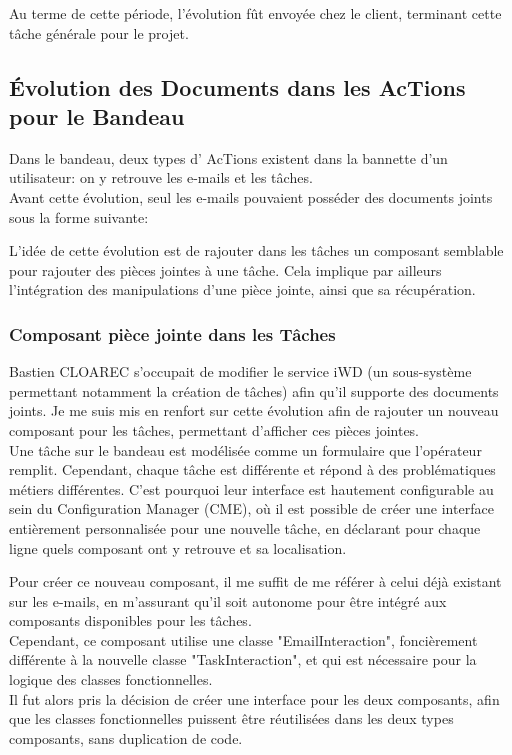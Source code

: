 \documentclass{rapport}
\begin{document}
Au terme de cette période, l'évolution fût envoyée chez le client, terminant cette tâche générale pour le projet.

\newpage
\subsection{Évolution des Documents dans les AcTions pour le Bandeau}

Dans le bandeau, deux types d' AcTions existent dans la bannette d'un utilisateur: on y retrouve les e-mails et les tâches.\\
Avant cette évolution, seul les e-mails pouvaient posséder des documents joints sous la forme suivante:


L'idée de cette évolution est de rajouter dans les tâches un composant semblable pour rajouter des pièces jointes à une tâche. Cela implique par ailleurs l'intégration des manipulations d'une pièce jointe, ainsi que sa récupération.\\

\subsubsection{Composant pièce jointe dans les Tâches}

Bastien CLOAREC s'occupait de modifier le service iWD (un sous-système permettant notamment la création de tâches) afin qu'il supporte des documents joints. Je me suis mis en renfort sur cette évolution afin de rajouter un nouveau composant pour les tâches, permettant d'afficher ces pièces jointes.\\

Une tâche sur le bandeau est modélisée comme un formulaire que l'opérateur remplit. Cependant, chaque tâche est différente et répond à des problématiques métiers différentes. C'est pourquoi leur interface est hautement configurable au sein du Configuration Manager (CME), où il est possible de créer une interface entièrement personnalisée pour une nouvelle tâche, en déclarant pour chaque ligne quels composant ont y retrouve et sa localisation.


Pour créer ce nouveau composant, il me suffit de me référer à celui déjà existant sur les e-mails, en m'assurant qu'il soit autonome pour être intégré aux composants disponibles pour les tâches.\\
Cependant, ce composant utilise une classe "EmailInteraction", foncièrement différente à la nouvelle classe "TaskInteraction", et qui est nécessaire pour la logique des classes fonctionnelles.\\
Il fut alors pris la décision de créer une interface pour les deux composants, afin que les classes fonctionnelles puissent être réutilisées dans les deux types composants, sans duplication de code. \\
\end{document}
